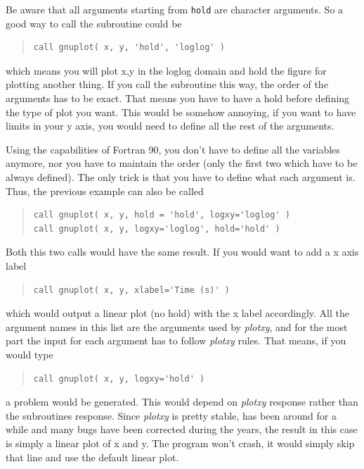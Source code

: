 \documentclass{article}
\begin{document}
Be aware that all arguments starting from \texttt{hold} are character arguments. So a good way to call the subroutine could be
\begin{quote}
\begin{verbatim}
call gnuplot( x, y, 'hold', 'loglog' )
\end{verbatim}
\end{quote}
which means you will plot x,y in the loglog domain and hold the figure for plotting another thing. If you call the subroutine this way, the order of the arguments has to be exact. That means you have to have a hold before defining the type of plot you want. This would be somehow annoying, if you want to have limits in your y axis, you would need to define all the rest of the arguments. 

Using the capabilities of Fortran 90, you don't have to define all the variables anymore, nor you have to maintain the order (only the first two which have to be always defined). The only trick is that you have to define what each argument is. Thus, the previous example can also be called 
\begin{quote}
\begin{verbatim}
call gnuplot( x, y, hold = 'hold', logxy='loglog' )
call gnuplot( x, y, logxy='loglog', hold='hold' )
\end{verbatim}
\end{quote}
Both this two calls would have the same result. If you would want to add a x axis label
\begin{quote}
\begin{verbatim}
call gnuplot( x, y, xlabel='Time (s)' )
\end{verbatim}
\end{quote}
which would output a linear plot (no hold) with the x label accordingly. All the argument names in this list are the arguments used by {\it plotxy}, and for the most part the input for each argument has to follow {\it plotxy} rules. That means, if you would type 
\begin{quote}
\begin{verbatim}
call gnuplot( x, y, logxy='hold' )
\end{verbatim}
\end{quote}
a problem would be generated. This would depend on {\it plotxy} response rather than the subroutines response. Since {\it plotxy} is pretty stable, has been around for a while and many bugs have been corrected during the years, the result in this case is simply a linear plot of x and y. The program won't crash, it would simply skip that line and use the default linear plot. 
\end{document}
